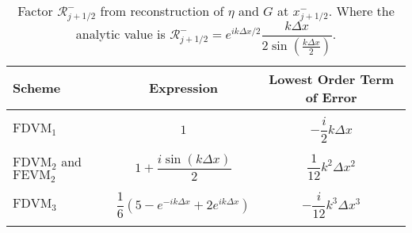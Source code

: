 \begin{table}
	\centering
	\begin{tabular}{l  c  c}
		Scheme& Expression& Lowest Order Term of Error\\
		\hline && \\
		$\text{FDVM}_1$& $1$ & $-\dfrac{i}{2}k \Delta x$ \\ & & \\
		$\text{FDVM}_2$ and $\text{FEVM}_2$& $1 +  \dfrac{i \sin\left(k\Delta x \right)}{2}$ & $\dfrac{1}{12}k^2 \Delta x^2$ \\ & & \\
		$\text{FDVM}_3$& $\dfrac{1}{6}\left({5 - e^{-i k {\Delta x}} +2 e^{i k {\Delta x}}} \right)$ & $-\dfrac{i}{12}k^3 \Delta x^3$ \\ & & \\
	\end{tabular}
	\caption{Factor $\mathcal{R}^-_{j+1/2}$ from reconstruction of $\eta$ and $G$ at $x^-_{j+1/2}$. Where the analytic value is $\mathcal{R}^-_{j+1/2} =e^{i k \Delta x/2} \dfrac{k\Delta x}{2 \sin\left(\frac{k \Delta x}{2}\right)}$.}
	\label{tab:Rmfactor}
\end{table}
%
